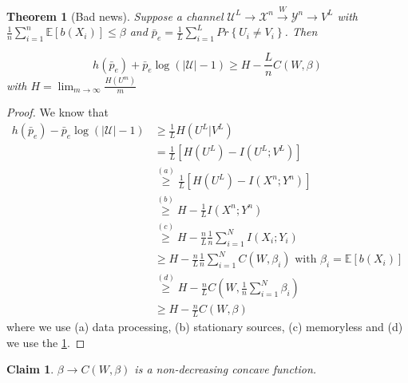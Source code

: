 \documentclass[twoside]{article}
\newtheorem{theorem}{Theorem}[section]
\newtheorem{claim}{Claim}[section]
\theoremstyle{definition} %
\renewcommand{\Pr}[1]{Pr\left\{#1\right\}}
\newcommand{\Ex}[1]{\mathbb{E}\left[#1\right]}
\def\U{\mathcal{U}}
\def\X{\mathcal{X}}
\def\Y{\mathcal{Y}}
\begin{document}
\begin{theorem}[Bad news]
  Suppose a channel $\U^L \to \X^n \xrightarrow{W} \Y^n \to V^L$ with $\frac 1 n \sum_{i=1}^n \Ex{b(X_i)} \leq \beta$ and $\bar p_e = \frac 1 L \sum_{i=1}^L \Pr{U_i \not= V_i}$. Then

  \[
    h(\bar p_e) + \bar p_e \log(|\U| - 1) \geq H - \frac L n C(W, \beta)
  \]
  with $H=\lim_{m \to\infty} \frac {H(U^m)} m$
\end{theorem}

\begin{proof}
  We know that
  \begin{align*}
    h(\bar p_e) - \bar p_e \log(|\U| - 1) &\geq \frac 1 L H(U^L| V^L)\\
    &=\frac 1 L [H(U^L) - I(U^L;V^L)]\\
    &\overset{(a)}\geq \frac 1 L [H(U^L) - I(X^n;Y^n)]\\
    &\overset{(b)}\geq H - \frac 1 L I(X^n;Y^n) \\
    &\overset{(c)}\geq H - \frac n L \frac 1 n \sum_{i=1}^N I(X_i;Y_i) \\
    &\geq H -  \frac n L \frac 1 n \sum_{i=1}^N C(W, \beta_i)\text{ with } \beta_i = \Ex{b(X_i)} \\
    &\overset{(d)}\geq H - \frac n L C\left(W, \frac 1 n \sum_{i=1}^N \beta_i\right) \\
    &\geq H - \frac n L C(W, \beta)
  \end{align*}
  where we use (a) data processing, (b) stationary sources, (c) memoryless and (d) we use the \cref{claim:concavity_inf}.
\end{proof}

\begin{claim}
  \label{claim:concavity_inf}
  $\beta \to C(W, \beta)$ is a non-decreasing concave function.
\end{claim}
\end{document}
